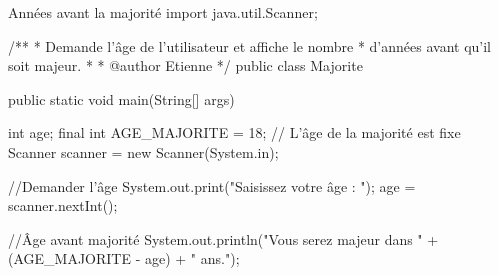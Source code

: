\documentclass[12pt]{report}
\begin{document}
\begin{MyTCB}{Années avant la majorité}
import java.util.Scanner;

/**
 * Demande l'âge de l'utilisateur et affiche le nombre
 * d'années avant qu'il soit majeur.
 * 
 * @author Etienne
 */
public class Majorite {

	public static void main(String[] args) {
		
		int age;
		final int AGE_MAJORITE = 18; // L'âge de la majorité est fixe
		Scanner scanner = new Scanner(System.in);
		
		//Demander l'âge
		System.out.print("Saisissez votre âge : ");
		age = scanner.nextInt();
		
		//Âge avant majorité
		System.out.println("Vous serez majeur dans " + (AGE_MAJORITE - age) + " ans.");

	}

}
\end{MyTCB}
\newpage
\end{document}
